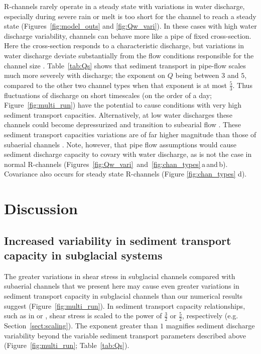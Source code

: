 \documentclass[tc, manuscript]{copernicus}
\newcommand{\alpine}{\textit{ALPINE}\,}
\begin{document}
R-channels rarely operate in a steady state with variations in water discharge, especially during severe rain or melt is too short for the channel to reach a steady state (Figures~\ref{fig:model_outs} and \ref{fig:Qw_vari}).
In these cases with high water discharge variability, channels can behave more like a pipe of fixed cross-section.
Here the cross-section responds to a characteristic discharge, but variations in water discharge deviate substantially from the flow conditions responsible for the channel size \citep[i.e. diurnal water discharge variations in \alpine{} case Figure \ref{fig:Qw_vari}; e.g.][]{gimbert2016}.
Table~\ref{tab:Qs} shows that sediment transport in pipe-flow scales much more severely with discharge; the exponent on $Q$ being between $3$ and $5$, compared to the other two channel types when that exponent is at most $\frac{5}{3}$.
Thus fluctuations of discharge on short timescales (on the order of a day; Figure~\ref{fig:multi_run}) have the potential to cause conditions with very high sediment transport capacities.
Alternatively, at low water discharges these channels could become depressurized and transition to subearial flow \citep{perolo2018}.
These sediment transport capacities variations are of far higher magnitude than those of subaerial channels \citep[][]{alley1997}.
Note, however, that pipe flow assumptions would cause sediment discharge capacity to covary with water discharge, as is not the case in normal R-channels (Figures~\ref{fig:Qw_vari}~and~\ref{fig:chan_types}\,a\,and\,b).
Covariance also occurs for steady state R-channels (Figure \ref{fig:chan_types} d).

\FloatBarrier
\section{Discussion}

\subsection{Increased variability in  sediment transport capacity in subglacial systems}
\label{sect:dis_qsc}

The greater variations in shear stress in subglacial channels compared with subaerial channels that we present here may cause even greater variations in sediment transport capacity in subglacial channels than our numerical results suggest  (Figure~\ref{fig:multi_run}).
In sediment transport capacity relationships, such as in \citet{meyer1948} or \citet{engelund1967}, shear stress is scaled to the power of $\frac{3}{2}$ or $\frac{5}{2}$, respectively (e.g. Section~\ref{sect:scaling}).
The exponent greater than $1$ magnifies sediment discharge variability beyond the variable sediment transport parameters described above (Figure~\ref{fig:multi_run}; Table~\ref{tab:Qs}).
\end{document}
